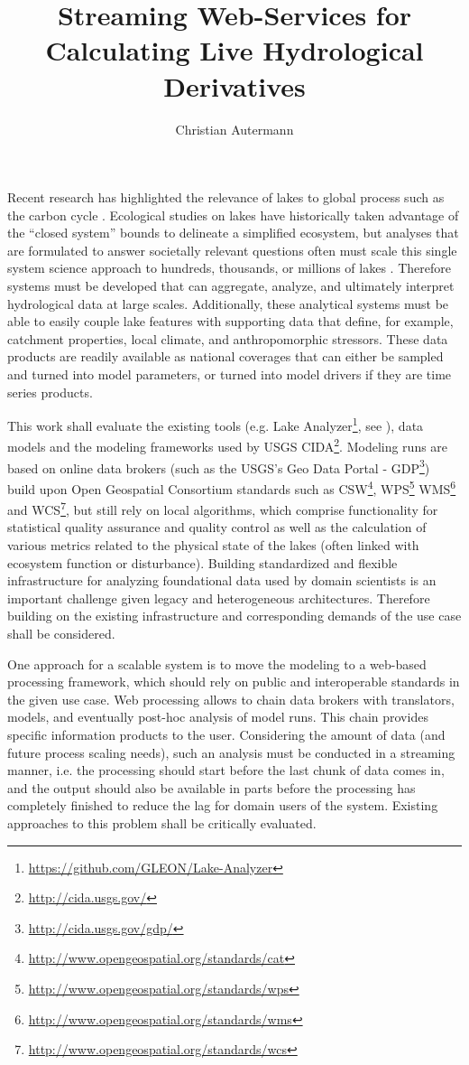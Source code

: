 \documentclass[paper=a4,fontsize=11pt]{scrartcl}
\title{Streaming Web-Services for Calculating Live Hydrological Derivatives}
\author{Christian Autermann}
\newcommand{\fu}[1]{\footnote{\url{#1}}}
\begin{document}
    \maketitle
    \onehalfspacing

    Recent research has highlighted the relevance of lakes to global process such as the carbon cycle \cite{cole}.
    Ecological studies on lakes have historically taken advantage of the “closed system” bounds to delineate a simplified ecosystem, but analyses that are formulated to answer societally relevant questions often must scale this single system science approach to hundreds, thousands, or millions of lakes \cite{downing}.
    Therefore systems must be developed that can aggregate, analyze, and ultimately interpret hydrological data at large scales. Additionally, these analytical systems must be able to easily couple lake features with supporting data that define, for example, catchment properties, local climate, and anthropomorphic stressors.
    These data products are readily available as national coverages that can either be sampled and turned into model parameters, or turned into model drivers if they are time series products.

    This work shall evaluate the existing tools (e.g. Lake Analyzer\fu{https://github.com/GLEON/Lake-Analyzer}, see \cite{lakeanalyzer}), data models and the modeling frameworks used by USGS CIDA\fu{http://cida.usgs.gov/}.
    Modeling runs are based on online data brokers (such as the USGS’s Geo Data Portal - GDP\fu{http://cida.usgs.gov/gdp/}) build upon Open Geospatial Consortium standards such as CSW\fu{http://www.opengeospatial.org/standards/cat}, WPS\fu{http://www.opengeospatial.org/standards/wps} WMS\fu{http://www.opengeospatial.org/standards/wms} and WCS\fu{http://www.opengeospatial.org/standards/wcs}, but still rely on local algorithms, which comprise functionality for statistical quality assurance and quality control as well as the calculation of various metrics related to the physical state of the lakes (often linked with ecosystem function or disturbance). Building standardized and flexible infrastructure for analyzing foundational data used by domain scientists is an important challenge given legacy and heterogeneous architectures.
    Therefore building on the existing infrastructure and corresponding demands of the use case shall be considered.

    One approach for a scalable system is to move the modeling to a web-based processing framework, which should rely on public and interoperable standards in the given use case.
    Web processing allows to chain data brokers with translators, models, and eventually post-hoc analysis of model runs.
    This chain provides specific information products to the user.
    Considering the amount of data (and future process scaling needs), such an analysis must be conducted in a streaming manner, i.e. the processing should start before the last chunk of data comes in, and the output should also be available in parts before the processing has completely finished to reduce the lag for domain users of the system.
    Existing approaches to this problem shall be critically evaluated.
\end{document}
